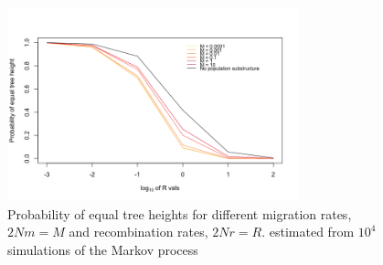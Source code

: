 \documentclass[11pt,oneside]{amsart}
\begin{document}

\begin{figure}[ht]
\centering
\includegraphics[width=0.75\textwidth]{pequalht.png}
\caption{Probability of equal tree heights for different migration rates, $2Nm = M$ and recombination rates, $2Nr = R$.  estimated from $10^4$ simulations of the Markov process}
\label{Figure: pequal height}
\end{figure}
\end{document}
